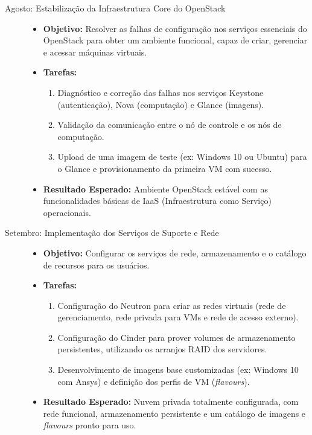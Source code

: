 \begin{description}
    \item[Agosto: Estabilização da Infraestrutura Core do OpenStack]
    \begin{itemize}
        \item \textbf{Objetivo:} Resolver as falhas de configuração nos serviços essenciais do OpenStack para obter um ambiente funcional, capaz de criar, gerenciar e acessar máquinas virtuais.
        \item \textbf{Tarefas:}
        \begin{enumerate}
            \item Diagnóstico e correção das falhas nos serviços Keystone (autenticação), Nova (computação) e Glance (imagens).
            \item Validação da comunicação entre o nó de controle e os nós de computação.
            \item Upload de uma imagem de teste (ex: Windows 10 ou Ubuntu) para o Glance e provisionamento da primeira VM com sucesso.
        \end{enumerate}
        \item \textbf{Resultado Esperado:} Ambiente OpenStack estável com as funcionalidades básicas de IaaS (Infraestrutura como Serviço) operacionais.
    \end{itemize}

    \item[Setembro: Implementação dos Serviços de Suporte e Rede]
    \begin{itemize}
        \item \textbf{Objetivo:} Configurar os serviços de rede, armazenamento e o catálogo de recursos para os usuários.
        \item \textbf{Tarefas:}
        \begin{enumerate}
            \item Configuração do Neutron para criar as redes virtuais (rede de gerenciamento, rede privada para VMs e rede de acesso externo).
            \item Configuração do Cinder para prover volumes de armazenamento persistentes, utilizando os arranjos RAID dos servidores.
            \item Desenvolvimento de imagens base customizadas (ex: Windows 10 com Ansys) e definição dos perfis de VM (\textit{flavours}).
        \end{enumerate}
        \item \textbf{Resultado Esperado:} Nuvem privada totalmente configurada, com rede funcional, armazenamento persistente e um catálogo de imagens e \textit{flavours} pronto para uso.
    \end{itemize}


\end{description}
